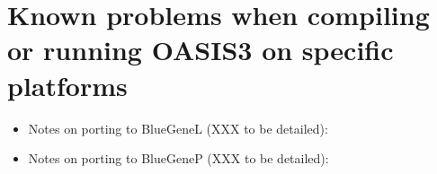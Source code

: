 \section{Known problems when compiling or running OASIS3 on specific platforms}

\begin{itemize}
\item  Notes on porting to BlueGeneL (XXX to be detailed):


\item  Notes on porting to BlueGeneP (XXX to be detailed):

%
%
\end{itemize}
